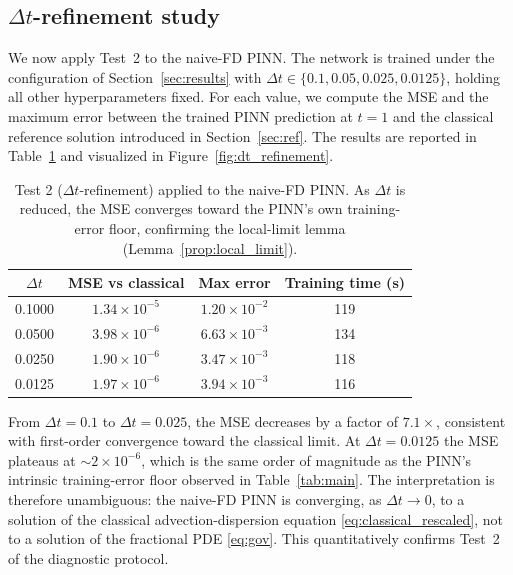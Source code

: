 \documentclass[11pt]{article}
\begin{document}
\subsection{\(\Delta t\)-refinement study}
\label{sec:dt_refinement_study}

We now apply Test~2 to the naive-FD PINN. The network is trained under
the configuration of Section~\ref{sec:results} with \(\Delta t \in
\{0.1, 0.05, 0.025, 0.0125\}\), holding all other hyperparameters fixed.
For each value, we compute the MSE and the maximum error between the
trained PINN prediction at \(t=1\) and the classical reference solution
introduced in Section~\ref{sec:ref}. The results are reported in
Table~\ref{tab:dt_refinement} and visualized in
Figure~\ref{fig:dt_refinement}.

\begin{table}[h]
\centering
\caption{Test 2 (\(\Delta t\)-refinement) applied to the naive-FD PINN.
         As \(\Delta t\) is reduced, the MSE converges toward the PINN's
         own training-error floor, confirming the local-limit lemma
         (Lemma~\ref{prop:local_limit}).}
\label{tab:dt_refinement}
\begin{tabular}{cccc}
\toprule
\(\Delta t\) & MSE vs classical & Max error & Training time (s) \\
\midrule
0.1000 & \(1.34\times 10^{-5}\) & \(1.20\times 10^{-2}\) & 119 \\
0.0500 & \(3.98\times 10^{-6}\) & \(6.63\times 10^{-3}\) & 134 \\
0.0250 & \(1.90\times 10^{-6}\) & \(3.47\times 10^{-3}\) & 118 \\
0.0125 & \(1.97\times 10^{-6}\) & \(3.94\times 10^{-3}\) & 116 \\
\bottomrule
\end{tabular}
\end{table}

From \(\Delta t = 0.1\) to \(\Delta t = 0.025\), the MSE decreases by
a factor of \(7.1\times\), consistent with first-order convergence
toward the classical limit. At \(\Delta t = 0.0125\) the MSE plateaus
at \(\sim 2\times 10^{-6}\), which is the same order of magnitude as
the PINN's intrinsic training-error floor observed in
Table~\ref{tab:main}. The interpretation is therefore unambiguous: the
naive-FD PINN is converging, as \(\Delta t\to 0\), to a solution of the
classical advection-dispersion equation \eqref{eq:classical_rescaled},
not to a solution of the fractional PDE \eqref{eq:gov}. This
quantitatively confirms Test~2 of the diagnostic protocol.
\end{document}
